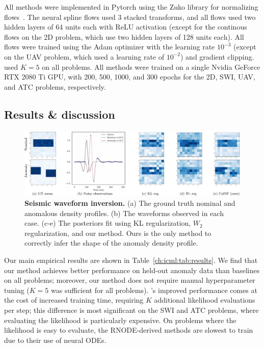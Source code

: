 All methods were implemented in Pytorch using the Zuko library for normalizing flows~\cite{ProbabilistsZuko2024}. The neural spline flows used 3 stacked transforms, and all flows used two hidden layers of 64 units each with ReLU activation (except for the continous flows on the 2D problem, which use two hidden layers of 128 units each). All flows were trained using the Adam optimizer with the learning rate $10^{-3}$ (except on the UAV problem, which used a learning rate of $10^{-2}$) and gradient clipping. \ouralg{} used $K=5$ on all problems. All methods were trained on a single Nvidia GeForce RTX 2080 Ti GPU, with 200, 500, 1000, and 300 epochs for the 2D, SWI, UAV, and ATC problems, respectively.

\subsection{Results \& discussion}



\begin{figure}[tb]
    \centering
    \includegraphics[width=\linewidth]{images/icml/swi_results/swi_summary.pdf}
    \caption{\textbf{Seismic waveform inversion.} (a) The ground truth nominal and anomalous density profiles. (b) The waveforms observed in each case. (c-e) The posteriors fit using KL regularization, $W_2$ regularization, and our \ouralg{} method. Ours is the only method to correctly infer the shape of the anomaly density profile.}
    \label{ch:icml:fig:swi_results}
\end{figure}

Our main empirical results are shown in Table~\ref{ch:icml:tab:results}. We find that our method achieves better performance on held-out anomaly data than baselines on all problems; moreover, our method does not require manual hyperparameter tuning ($K=5$ was sufficient for all problems). \ouralg{}'s improved performance comes at the cost of increased training time, requiring $K$ additional likelihood evaluations per step; this difference is most significant on the SWI and ATC problems, where evaluating the likelihood is particularly expensive. On problems where the likelihood is easy to evaluate, the RNODE-derived methods are slowest to train due to their use of neural ODEs.

